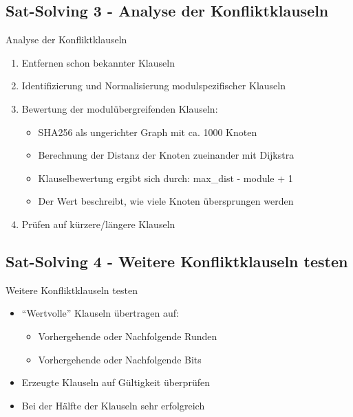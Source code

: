 \documentclass{beamer}
\begin{document}
  \subsection{Sat-Solving 3 - Analyse der Konfliktklauseln}
    \begin{frame}{Analyse der Konfliktklauseln}
      \begin{enumerate}
        \setlength{\itemsep}{20pt}
        \item Entfernen schon bekannter Klauseln
        \item Identifizierung und Normalisierung modulspezifischer Klauseln
        \item Bewertung der modulübergreifenden Klauseln:
        \begin{itemize}
          \item SHA256 als ungerichter Graph mit ca. 1000 Knoten
          \item Berechnung der Distanz der Knoten zueinander mit Dijkstra
          \item Klauselbewertung ergibt sich durch: max\_dist - module + 1
          \item Der Wert beschreibt, wie viele Knoten übersprungen werden
        \end{itemize}
        \item Prüfen auf kürzere/längere Klauseln
      \end{enumerate}
    \end{frame}
  \subsection{Sat-Solving 4 - Weitere Konfliktklauseln testen}
    \begin{frame}{Weitere Konfliktklauseln testen}
      \begin{itemize}
        \setlength{\itemsep}{20pt}
        \item "`Wertvolle"' Klauseln übertragen auf:
        \begin{itemize}
          \item Vorhergehende oder Nachfolgende Runden
          \item Vorhergehende oder Nachfolgende Bits
        \end{itemize}
        \item Erzeugte Klauseln auf Gültigkeit überprüfen
        \item Bei der Hälfte der Klauseln sehr erfolgreich
      \end{itemize}
    \end{frame}
\end{document}
